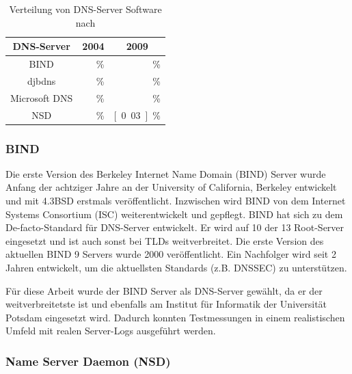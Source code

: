 \documentclass[a4paper, 12pt, BCOR10mm, DIV12, toc=bibliography, toc=listof, german]{scrbook}
\begin{document}
				\begin{table}
					\centering
					\begin{tabular}{|c|r|r|}\hline
						DNS-Server & \multicolumn{1}{c|}{2004} & \multicolumn{1}{c|}{2009} \\\hline\hline
						BIND & \unit[70,11]{\%} & \unit[73,85]{\%} \\
						djbdns & \unit[15,57]{\%} & \unit[2,56]{\%} \\
						Microsoft DNS & \unit[6,24]{\%} & \unit[0,26]{\%}\\
						NSD & \unit[0,20]{\%} & \unit[0.03]{\%} \\\hline
					\end{tabular}
					\caption{Verteilung von DNS-Server Software nach \cite{survey2004, survey2009}}
					\label{tab:verteilung}
				\end{table}

				\subsubsection*{BIND} %

				Die erste Version des Berkeley Internet Name Domain (BIND) \cite{bind} Server wurde
				Anfang der achtziger Jahre an der University of California, Berkeley entwickelt und mit
				4.3BSD erstmals veröffentlicht. Inzwischen wird BIND von dem Internet Systems Consortium
				(ISC) weiterentwickelt und gepflegt. BIND hat sich zu dem De-facto-Standard für DNS-Server
				entwickelt. Er wird auf 10 der 13 Root-Server eingesetzt und ist auch sonst bei TLDs
				weitverbreitet. Die erste Version des aktuellen BIND 9 Servers wurde 2000 veröffentlicht.
				Ein Nachfolger wird seit 2 Jahren entwickelt, um die aktuellsten Standards (z.B. DNSSEC) zu
				unterstützen.

				Für diese Arbeit wurde der BIND Server als DNS-Server gewählt, da er der weitverbreitetste
				ist und ebenfalls am Institut für Informatik der Universität Potsdam eingesetzt wird.
				Dadurch konnten Testmessungen in einem realistischen Umfeld mit realen Server-Logs
				ausgeführt werden.


				\subsubsection*{Name Server Daemon (NSD)} %
\end{document}
